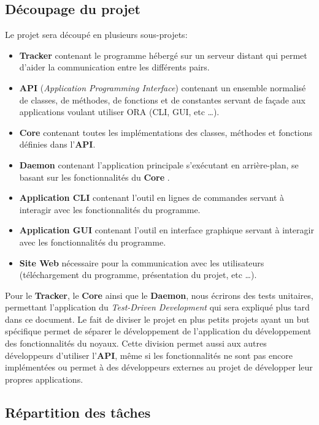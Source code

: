 \documentclass[11pt, a4paper]{specifications}
\begin{document}
    \subsection{Découpage du projet}
Le projet sera découpé en plusieurs sous-projets:
\begin{itemize}
  \item \textbf{Tracker} contenant le programme hébergé sur un serveur distant qui permet d'aider la communication entre les différents pairs.
  \item \textbf{API} (\textit{Application Programming Interface}) contenant un ensemble normalisé de classes, de méthodes, de fonctions et de constantes servant de façade aux applications voulant utiliser ORA (CLI, GUI, etc \ldots).
  \item \textbf{Core} contenant toutes les implémentations des classes, méthodes et fonctions définies dans l'\textbf{API}.
  \item \textbf{Daemon} contenant l'application principale s'exécutant en arrière-plan, se basant sur les fonctionnalités du \textbf{Core} .
  \item \textbf{Application CLI} contenant l'outil en lignes de commandes servant à interagir avec les fonctionnalités du programme.
  \item \textbf{Application GUI} contenant l'outil en interface graphique servant à interagir avec les fonctionnalités du programme.
  \item \textbf{Site Web} nécessaire pour la communication avec les utilisateurs (téléchargement du programme, présentation du projet, etc \ldots).
\end{itemize}
\bigbreak

Pour le \textbf{Tracker}, le \textbf{Core} ainsi que le \textbf{Daemon}, nous écrirons des tests unitaires, permettant l'application du \textit{Test-Driven Development} qui sera expliqué plus tard dans ce document.
Le fait de diviser le projet en plus petits projets ayant un but spécifique permet de séparer le développement de l'application du développement des fonctionnalités du noyaux. Cette division permet aussi aux autres développeurs d'utiliser l'\textbf{API}, même si les fonctionnalités ne sont pas encore implémentées ou permet à des développeurs externes au projet de développer leur propres applications. \clearpage

    \subsection{Répartition des tâches}
\end{document}
